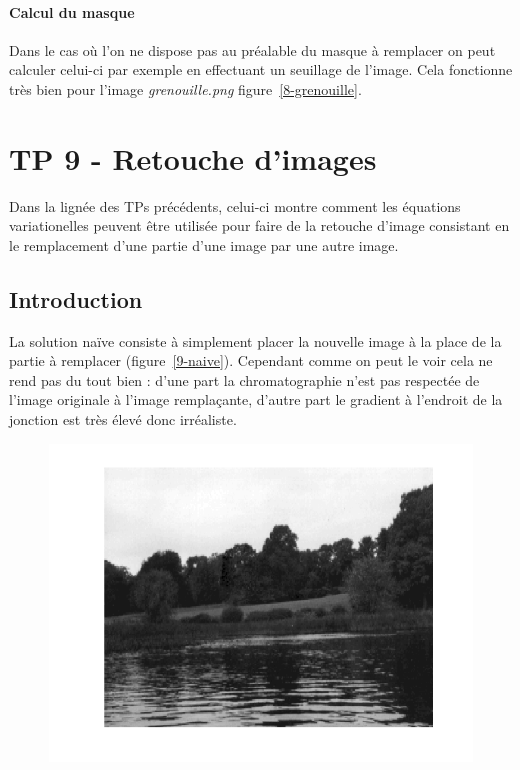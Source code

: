 \documentclass{article}
\begin{document}
\paragraph{Calcul du masque}
Dans le cas où l'on ne dispose pas au préalable du masque à remplacer on peut calculer celui-ci par exemple en effectuant un seuillage de l'image. Cela fonctionne très bien pour l'image \emph{grenouille.png} figure~\ref{8-grenouille}.


\section{TP 9 - Retouche d'images}
Dans la lignée des TPs précédents, celui-ci montre comment les équations variationelles peuvent être utilisée pour faire de la retouche d'image consistant en le remplacement d'une partie d'une image par une autre image.

\subsection{Introduction}
La solution naïve consiste à simplement placer la nouvelle image à la place de la partie à remplacer (figure~\ref{9-naive}). Cependant comme on peut le voir cela ne rend pas du tout bien : d'une part la chromatographie n'est pas respectée de l'image originale à l'image remplaçante, d'autre part le gradient à l'endroit de la jonction est très élevé donc irréaliste.

\begin{figure}[!ht]
\includegraphics[width=\textwidth]{images/1/1-1-autumn_b.png}
\end{figure}
\end{document}
